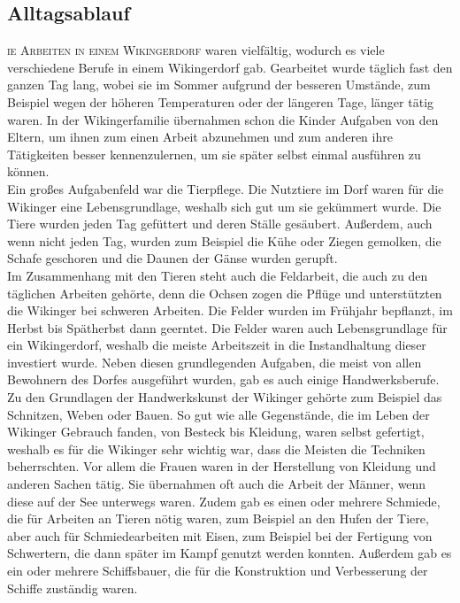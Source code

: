 \documentclass[12pt,a4paper,ngerman,openany]{book}
\newcommand{\flettrine}[2]{\lettrine[lines=2, depth=0, loversize=0.25, nindent=0.69pt, lraise=0.15]{\initfamily{#1}}{#2}}
\newcommand*\initfamily{\usefont{U}{GotIn}{xl}{n}}
\begin{document}
\subsection{Alltagsablauf}
\flettrine{D}{ie Arbeiten in einem Wikingerdorf} waren vielfältig, wodurch es viele verschiedene Berufe in einem Wikingerdorf gab.
Gearbeitet wurde täglich fast den ganzen Tag lang, wobei sie im Sommer aufgrund der besseren Umstände, zum Beispiel wegen der höheren Temperaturen oder der längeren Tage, länger tätig waren. In der Wikingerfamilie übernahmen schon die Kinder Aufgaben von den Eltern, um ihnen zum einen Arbeit abzunehmen und zum anderen ihre Tätigkeiten besser kennenzulernen, um sie später selbst einmal ausführen zu können.\\
Ein großes Aufgabenfeld war die Tierpflege. Die Nutztiere im Dorf waren für die Wikinger eine Lebensgrundlage, weshalb sich gut um sie gekümmert wurde. Die Tiere wurden jeden Tag gefüttert und deren Ställe gesäubert. Außerdem, auch wenn nicht jeden Tag, wurden zum Beispiel die Kühe oder Ziegen gemolken, die Schafe geschoren und die Daunen der Gänse wurden gerupft.\\
Im Zusammenhang mit den Tieren steht auch die Feldarbeit, die auch zu den täglichen Arbeiten gehörte, denn die Ochsen zogen die Pflüge und unterstützten die Wikinger bei schweren Arbeiten. Die Felder wurden im Frühjahr bepflanzt, im Herbst bis Spätherbst dann geerntet. Die Felder waren auch Lebensgrundlage für ein Wikingerdorf, weshalb die meiste Arbeitszeit in die Instandhaltung dieser investiert wurde. Neben diesen grundlegenden Aufgaben, die meist von allen Bewohnern des Dorfes ausgeführt wurden, gab es auch einige Handwerksberufe.
Zu den Grundlagen der Handwerkskunst der Wikinger gehörte zum Beispiel das Schnitzen,
Weben oder Bauen. So gut wie alle Gegenstände, die im Leben der Wikinger Gebrauch
fanden, von Besteck bis Kleidung, waren selbst gefertigt, weshalb es für die Wikinger sehr
wichtig war, dass die Meisten die Techniken beherrschten. Vor allem die Frauen waren in
der Herstellung von Kleidung und anderen Sachen tätig. Sie übernahmen oft auch die Arbeit der Männer, wenn diese auf der See unterwegs waren.
Zudem gab es einen oder mehrere Schmiede, die für Arbeiten an Tieren nötig waren, zum Beispiel an den Hufen der Tiere, aber auch für Schmiedearbeiten mit Eisen, zum Beispiel bei der Fertigung von Schwertern, die dann später im Kampf genutzt werden konnten. Außerdem gab es ein oder mehrere Schiffsbauer, die für die Konstruktion und Verbesserung der Schiffe zuständig waren.\\
\end{document}
